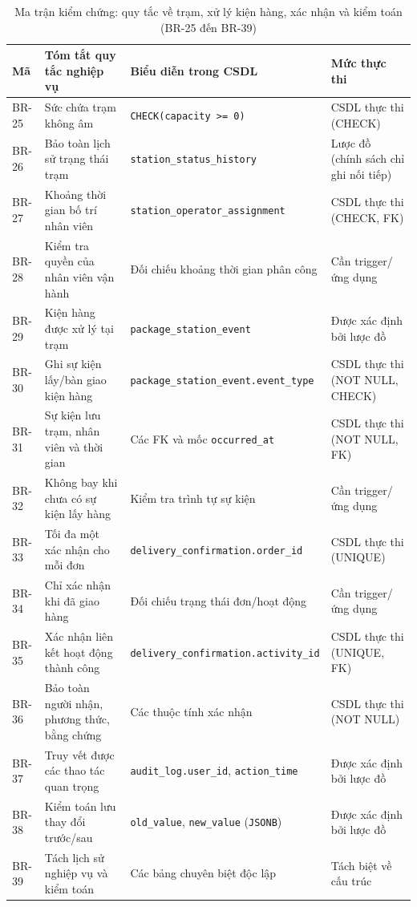 \begin{table}[htbp]
\caption{Ma trận kiểm chứng: quy tắc về trạm, xử lý kiện hàng, xác nhận và kiểm toán (BR-25 đến BR-39)}
\label{tab:br_validation_part2}
\centering
\small
\begin{tabular*}{\textwidth}{@{\extracolsep{\fill}} p{1.2cm} p{5.5cm} p{4.2cm} p{3.5cm}}
\toprule
\textbf{Mã} & \textbf{Tóm tắt quy tắc nghiệp vụ} & \textbf{Biểu diễn trong CSDL} & \textbf{Mức thực thi} \\
\midrule
BR-25 & Sức chứa trạm không âm & \texttt{CHECK(capacity >= 0)} & CSDL thực thi (CHECK) \\
BR-26 & Bảo toàn lịch sử trạng thái trạm & \texttt{station\_status\_history} & Lược đồ (chính sách chỉ ghi nối tiếp) \\
BR-27 & Khoảng thời gian bố trí nhân viên & \texttt{station\_operator\_assignment} & CSDL thực thi (CHECK, FK) \\
BR-28 & Kiểm tra quyền của nhân viên vận hành & Đối chiếu khoảng thời gian phân công & Cần trigger/ứng dụng \\
BR-29 & Kiện hàng được xử lý tại trạm & \texttt{package\_station\_event} & Được xác định bởi lược đồ \\
BR-30 & Ghi sự kiện lấy/bàn giao kiện hàng & \texttt{package\_station\_event.event\_type} & CSDL thực thi (NOT NULL, CHECK) \\
BR-31 & Sự kiện lưu trạm, nhân viên và thời gian & Các FK và mốc \texttt{occurred\_at} & CSDL thực thi (NOT NULL, FK) \\
BR-32 & Không bay khi chưa có sự kiện lấy hàng & Kiểm tra trình tự sự kiện & Cần trigger/ứng dụng \\
BR-33 & Tối đa một xác nhận cho mỗi đơn & \texttt{delivery\_confirmation.order\_id} & CSDL thực thi (UNIQUE) \\
BR-34 & Chỉ xác nhận khi đã giao hàng & Đối chiếu trạng thái đơn/hoạt động & Cần trigger/ứng dụng \\
BR-35 & Xác nhận liên kết hoạt động thành công & \texttt{delivery\_confirmation.activity\_id} & CSDL thực thi (UNIQUE, FK) \\
BR-36 & Bảo toàn người nhận, phương thức, bằng chứng & Các thuộc tính xác nhận & CSDL thực thi (NOT NULL) \\
BR-37 & Truy vết được các thao tác quan trọng & \texttt{audit\_log.user\_id}, \texttt{action\_time} & Được xác định bởi lược đồ \\
BR-38 & Kiểm toán lưu thay đổi trước/sau & \texttt{old\_value}, \texttt{new\_value} (\texttt{JSONB}) & Được xác định bởi lược đồ \\
BR-39 & Tách lịch sử nghiệp vụ và kiểm toán & Các bảng chuyên biệt độc lập & Tách biệt về cấu trúc \\
\bottomrule
\end{tabular*}
\end{table}

